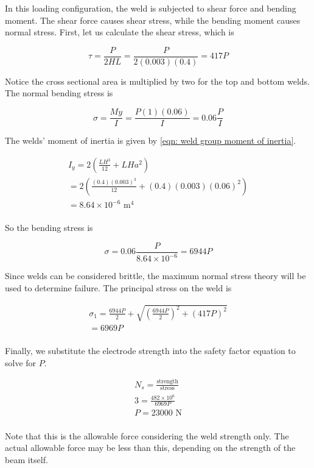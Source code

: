 \documentclass[
10pt,
a4paper,
openany,
svgnames,
]{book}
\begin{document}
\begin{solution}

  In this loading configuration, the weld is subjected to shear force and bending moment. The shear force causes shear stress, while the bending moment causes normal stress. First, let us calculate the shear stress, which is

  \[\tau  = \frac{P}{2HL} = \frac{P}{2(0.003)(0.4)} = 417P\]

  Notice the cross sectional area is multiplied by two for the top and bottom welds. The normal bending stress is

  \[\sigma  = \frac{My}{I} = \frac{P(1)(0.06)}{I} = 0.06\frac{P}{I}\]

  The welds’ moment of inertia is given by \cref{eqn: weld group moment of inertia}.

  \[\begin{gathered}
      I_y = 2\left( \frac{LH^3}{12} + LHa^2 \right) \\ 
      = 2\left( \frac{(0.4)(0.003)^3}{12} + (0.4)(0.003)(0.06)^2 \right) \\ 
      = 8.64 \times 10^{-6} \text{ m}^4 \\ 
    \end{gathered} \]

  So the bending stress is

  \[\sigma  = 0.06\frac{P}{8.64 \times 10^{-6}} = 6944P\]

  Since welds can be considered brittle, the maximum normal stress theory will be used to determine failure. The principal stress on the weld is

  \[\begin{gathered}
      \sigma _1 = \frac{6944P}{2} + \sqrt {\left( \frac{6944P}{2} \right)^2 + (417P)^2}  \\ 
      = 6969P \\ 
    \end{gathered} \]

  Finally, we substitute the electrode strength into the safety factor equation to solve for $P$.

  \[\begin{gathered}
      N_s = \frac{\text{strength}}{\text{stress}} \\ 
      3 = \frac{482 \times 10^6}{6969P} \\ 
      P = 23000 \text{ N} \\ 
    \end{gathered} \]

  Note that this is the allowable force considering the weld strength only. The actual allowable force may be less than this, depending on the strength of the beam itself.
\end{solution}
\end{document}
